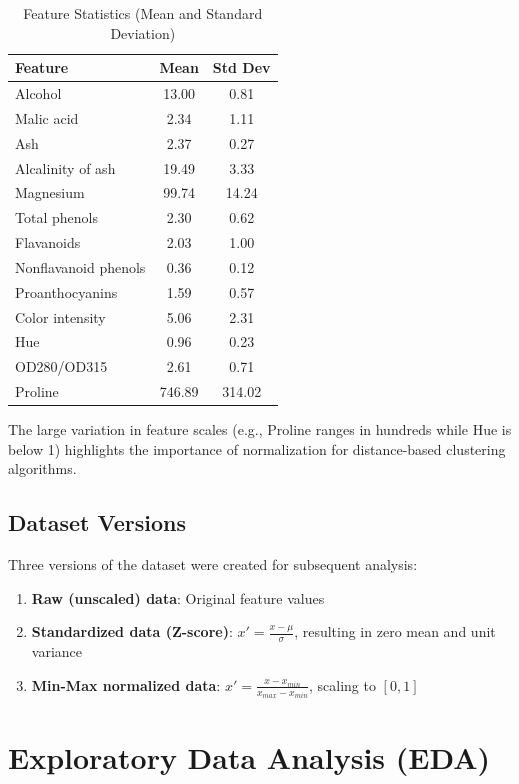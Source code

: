 \documentclass[12pt,a4paper]{article}
\begin{document}
\begin{table}[H]
\centering
\caption{Feature Statistics (Mean and Standard Deviation)}
\label{tab:feature_stats}
\begin{tabular}{lcc}
\toprule
\textbf{Feature} & \textbf{Mean} & \textbf{Std Dev} \\
\midrule
Alcohol & 13.00 & 0.81 \\
Malic acid & 2.34 & 1.11 \\
Ash & 2.37 & 0.27 \\
Alcalinity of ash & 19.49 & 3.33 \\
Magnesium & 99.74 & 14.24 \\
Total phenols & 2.30 & 0.62 \\
Flavanoids & 2.03 & 1.00 \\
Nonflavanoid phenols & 0.36 & 0.12 \\
Proanthocyanins & 1.59 & 0.57 \\
Color intensity & 5.06 & 2.31 \\
Hue & 0.96 & 0.23 \\
OD280/OD315 & 2.61 & 0.71 \\
Proline & 746.89 & 314.02 \\
\bottomrule
\end{tabular}
\end{table}

The large variation in feature scales (e.g., Proline ranges in hundreds while Hue is below 1) highlights the importance of normalization for distance-based clustering algorithms.

\subsection{Dataset Versions}

Three versions of the dataset were created for subsequent analysis:

\begin{enumerate}
    \item \textbf{Raw (unscaled) data}: Original feature values
    \item \textbf{Standardized data (Z-score)}: $x' = \frac{x - \mu}{\sigma}$, resulting in zero mean and unit variance
    \item \textbf{Min-Max normalized data}: $x' = \frac{x - x_{min}}{x_{max} - x_{min}}$, scaling to $[0, 1]$
\end{enumerate}

\section{Exploratory Data Analysis (EDA)}
\end{document}
